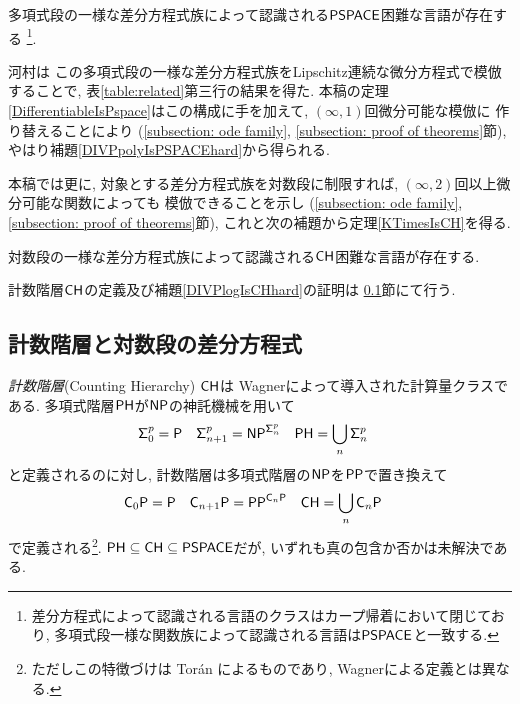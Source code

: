 \begin{lemma}
 \label{DIVPpolyIsPSPACEhard}
 多項式段の一様な差分方程式族によって認識される$\mathsf{PSPACE}$困難な言語が存在する
 \footnote{差分方程式によって認識される言語のクラスはカープ帰着において閉じており,
多項式段一様な関数族によって認識される言語は$\mathsf{PSPACE}$と一致する.}.
\end{lemma}

河村\cite{kawamura2010lipschitz}は
この多項式段の一様な差分方程式族をLipschitz連続な微分方程式で模倣することで, 
表\ref{table:related}第三行の結果を得た. 
本稿の定理\ref{DifferentiableIsPspace}はこの構成に手を加えて, 
$(\infty, 1)$回微分可能な模倣に
作り替えることにより
(\ref{subsection: ode family}, \ref{subsection: proof of theorems}節), 
やはり補題\ref{DIVPpolyIsPSPACEhard}から得られる. 

本稿では更に, 対象とする差分方程式族を対数段に制限すれば, 
$(\infty, 2)$回以上微分可能な関数によっても
模倣できることを示し
(\ref{subsection: ode family}, \ref{subsection: proof of theorems}節), 
これと次の補題から定理\ref{KTimesIsCH}を得る. 

\begin{lemma}
 \label{DIVPlogIsCHhard}
 対数段の一様な差分方程式族によって認識される$\mathsf{CH}$困難な言語が存在する.
\end{lemma}

計数階層$\mathsf{CH}$の定義及び補題\ref{DIVPlogIsCHhard}の証明は
\ref{subsection: counting hierarchy}節にて行う.

\subsection{計数階層と対数段の差分方程式}
\label{subsection: counting hierarchy}

\emph{計数階層}\kern\xkanjiskip(Counting Hierarchy) $\mathsf{CH}$は
Wagnerによって導入された計算量クラスである\cite{wagner1986complexity}.
多項式階層$\mathsf{PH}$が$\mathsf{NP}$の神託機械を用いて
\begin{align*}
 \mathsf{\Sigma}^p_0  &= \mathsf{P}
 &
 \mathsf{\Sigma}^p_{n+1} &= \mathsf{NP} ^{\mathsf{\Sigma}^p_n}
 &
 \mathsf{PH} &= \bigcup_n \mathsf{\Sigma}^p_n
\end{align*}
と定義されるのに対し,
計数階層は多項式階層の$\mathsf{NP}$を$\mathsf{PP}$で置き換えて
\begin{align*}
 \mathsf{C}_0 \mathsf{P}  &= \mathsf{P}
 &
 \mathsf{C}_{n+1} \mathsf{P} &= \mathsf{PP}^{\mathsf{C}_n \mathsf{P}}
 &
 \mathsf{CH} &= \bigcup_n \mathsf{C}_n \mathsf{P}
\end{align*}
で定義される\footnote{ただしこの特徴づけは Tor{\'a}n によるものであり,
Wagnerによる定義とは異なる\cite{toran1991complexity}.
}. $\mathsf{PH} \subseteq \mathsf{CH} \subseteq \mathsf{PSPACE}$だが,
いずれも真の包含か否かは未解決である.



